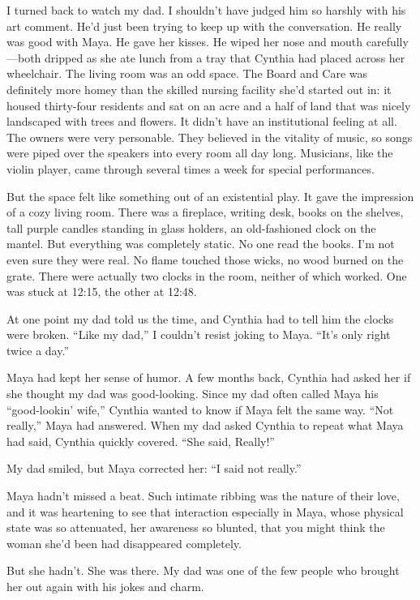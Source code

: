 \documentclass[12pt]{book}
\begin{document}
I turned back to watch my dad. I shouldn't have judged him so harshly with his art comment. He'd just been trying to keep up with the conversation. He really was good with Maya. He gave her kisses. He wiped her nose and mouth carefully---both dripped as she ate lunch from a tray that Cynthia had placed across her wheelchair. The living room was an odd space. The Board and Care was definitely more homey than the skilled nursing facility she'd started out in: it housed thirty-four residents and sat on an acre and a half of land that was nicely landscaped with trees and flowers. It didn't have an institutional feeling at all. The owners were very personable. They believed in the vitality of music, so songs were piped over the speakers into every room all day long. Musicians, like the violin player, came through several times a week for special performances.

But the space felt like something out of an existential play. It gave the impression of a cozy living room. There was a fireplace, writing desk, books on the shelves, tall purple candles standing in glass holders, an old-fashioned clock on the mantel. But everything was completely static. No one read the books. I'm not even sure they were real. No flame touched those wicks, no wood burned on the grate. There were actually two clocks in the room, neither of which worked. One was stuck at 12:15, the other at 12:48.

At one point my dad told us the time, and Cynthia had to tell him the clocks were broken. ``Like my dad,'' I couldn't resist joking to Maya. ``It's only right twice a day.''

Maya had kept her sense of humor. A few months back, Cynthia had asked her if she thought my dad was good-looking. Since my dad often called Maya his ``good-lookin' wife,'' Cynthia wanted to know if Maya felt the same way. ``Not really,'' Maya had answered. When my dad asked Cynthia to repeat what Maya had said, Cynthia quickly covered. ``She said, Really!''

My dad smiled, but Maya corrected her: ``I said not really.''

Maya hadn't missed a beat. Such intimate ribbing was the nature of their love, and it was heartening to see that interaction especially in Maya, whose physical state was so attenuated, her awareness so blunted, that you might think the woman she'd been had disappeared completely.

But she hadn't. She was there. My dad was one of the few people who brought her out again with his jokes and charm.
\end{document}
